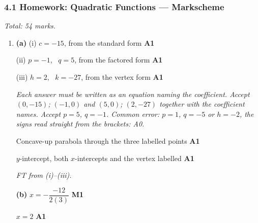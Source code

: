 \documentclass[12pt, twoside]{article}
\begin{document}
\subsubsection*{4.1 Homework: Quadratic Functions --- Markscheme}

\emph{Total: 54 marks.}

\begin{enumerate}[itemsep=0.3cm]

\item[1.] [Maximum mark: 14]

\textbf{(a)} (i) $c = -15$, from the standard form \hfill \textbf{A1}

(ii) $p = -1$, \ $q = 5$, from the factored form \hfill \textbf{A1}

(iii) $h = 2$, \ $k = -27$, from the vertex form \hfill \textbf{A1}

\emph{Each answer must be written as an equation naming the coefficient.
Accept $(0, -15)$; $(-1, 0)$ and $(5, 0)$; $(2, -27)$ together with the
coefficient names. Accept $p = 5$, $q = -1$. Common error: $p = 1$,
$q = -5$ or $h = -2$, the signs read straight from the brackets: A0.}

\begin{center}
\end{center}

Concave-up parabola through the three labelled points \hfill \textbf{A1}

$y$-intercept, both $x$-intercepts and the vertex labelled \hfill \textbf{A1}

\emph{FT from (i)--(iii).}

\textbf{(b)} $x = -\dfrac{-12}{2(3)}$ \hfill \textbf{M1}

$x = 2$ \hfill \textbf{A1}


\end{enumerate}
\end{document}

